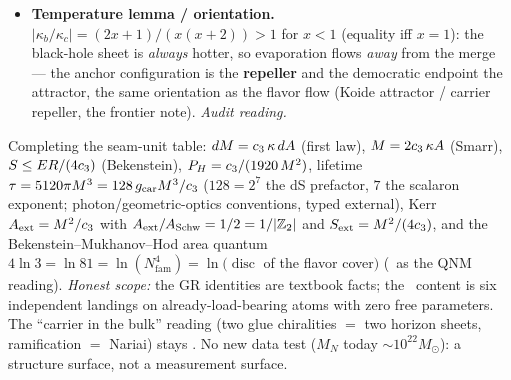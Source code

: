 \begin{keybox}[Nariai $=$ the anchor; the Koide $2/3$ is the entropy bound \mE\ (\veri{v101\_horizon\_anchor.py})]
\begin{itemize}
sheet $\Z_2$ and of the split $N_{\mathrm{fam}}$-linear cover $(3x{+}2)(3x{+}5)$ of the flavor sector (Fig.~\ref{fig:sdscover}).
The two branch structures share one $N_{\mathrm{fam}}$-linear ramification: the affine map
$q=\tfrac72+\tfrac{N_{\mathrm{fam}}^2}{2}m$ carries the SdS branch points $m={\pm}1/N_{\mathrm{fam}}$ onto the
flavor branch labels $\{2,5\}=\{|\Z_2|,g_{\mathrm{car}}\}$ (midpoint $7/2$). This is an exact \emph{relabeling} --- the
shared invariant is the $2/3$ ramification, not the map, which exists for any two pairs of points --- so it
is recorded as a \mC\ structural alignment, not a theorem ().
\item \textbf{Temperature lemma / orientation.} $|\kappa_b/\kappa_c|=(2x{+}1)/(x(x{+}2))>1$ for $x<1$
(equality iff $x=1$): the black-hole sheet is \emph{always} hotter, so evaporation flows \emph{away} from
the merge --- the anchor configuration is the \textbf{repeller} and the democratic endpoint the attractor,
the same orientation as the flavor flow (Koide attractor / carrier repeller, the frontier note). \emph{Audit reading.}
\end{itemize}
Completing the seam-unit table: $dM=c_3\,\kappa\,dA$ (first law), $M=2c_3\,\kappa A$ (Smarr),
$S\le ER/(4c_3)$ (Bekenstein), $P_H=c_3/(1920\,M^2)$, lifetime
$\tau=5120\pi M^3=128\,g_{\mathrm{car}}M^3/c_3$ ($128=2^7$ the dS prefactor, $7$ the scalaron exponent;
photon/geometric-optics conventions, typed external), Kerr $A_{\mathrm{ext}}=M^2/c_3$ with
$A_{\mathrm{ext}}/A_{\mathrm{Schw}}=1/2=1/|\mathbb{Z}_2|$ and $S_{\mathrm{ext}}=M^2/(4c_3)$, and the
Bekenstein--Mukhanov--Hod area quantum $4\ln3=\ln81=\ln(N_{\mathrm{fam}}^4)=\ln(\operatorname{disc}$ of the flavor
cover$)$ (\mC\ as the QNM reading). \emph{Honest scope:} the GR identities are textbook facts; the \mE\
content is six independent landings on already-load-bearing atoms with zero free parameters. The
``carrier in the bulk'' reading (two glue chiralities $=$ two horizon sheets, ramification $=$ Nariai)
stays \mC. No new data test ($M_N$ today $\sim10^{22}M_\odot$): a structure surface, not a measurement
surface.
\end{keybox}

